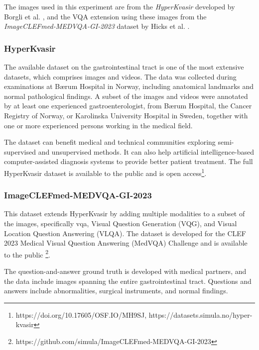         The images used in this experiment are from the \textit{HyperKvasir} developed by Borgli et al. \cite{borgliHyperKvasirComprehensiveMulticlass2020}, and the VQA extension using these images from the \textit{ImageCLEFmed-MEDVQA-GI-2023} dataset by Hicks et al. \cite{hicksImageCLEFmedMEDVQAGI20232023, hicksImageCLEFmedMEDVQAGIImageCLEF}. 
        
        \subsubsection{HyperKvasir}
        The available dataset on the gastrointestinal tract is one of the most extensive datasets, which comprises images and videos. The data was collected during examinations at Bærum Hospital in Norway, including anatomical landmarks and normal pathological findings.
        A subset of the images and videos were annotated by at least one experienced gastroenterologist, from Bærum Hospital, the Cancer Registry of Norway, or Karolinska University Hospital in Sweden, together with one or more experienced persons working in the medical field.  
        
        The dataset can benefit medical and technical communities exploring semi-supervised and unsupervised methods. It can also help artificial intelligence-based computer-assisted diagnosis systems to provide better patient treatment.
        The full HyperKvasir dataset is available to the public and is open access\footnote{https://doi.org/10.17605/OSF.IO/MH9SJ, https://datasets.simula.no/hyper-kvasir}.


      
        \subsubsection{ImageCLEFmed-MEDVQA-GI-2023}

        This dataset extends HyperKvasir by adding multiple modalities to a subset of the images, specifically \gls{vqa}, Visual Question Generation (VQG), and Visual Location Question Answering (VLQA).
        The dataset is developed for the CLEF 2023 Medical Visual Question Answering (MedVQA) Challenge and is available to the public \footnote{https://github.com/simula/ImageCLEFmed-MEDVQA-GI-2023}.
        
        The  question-and-answer ground truth is developed with medical partners, and the data include images spanning the entire gastrointestinal tract. Questions and answers include abnormalities, surgical instruments, and normal findings. 
        
